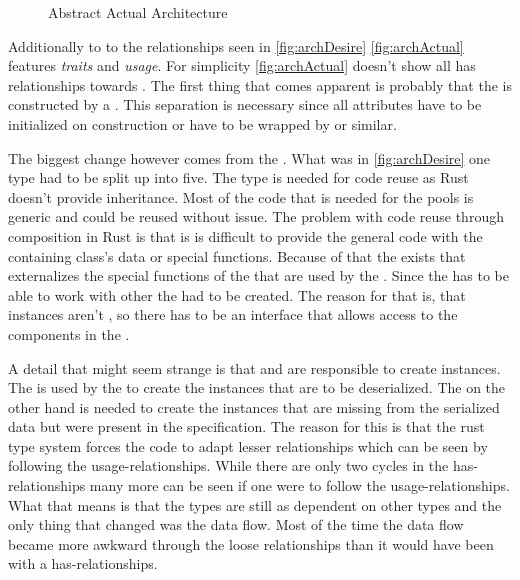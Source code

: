 \documentclass[thesis]{subfiles}
\begin{document}
  \begin{figure}[ht]
    \centering
    
    \caption{Abstract Actual Architecture}\label{fig:archActual}
  \end{figure}

  Additionally to to the relationships seen in \autoref{fig:archDesire} \autoref{fig:archActual} features \emph{traits} and \emph{usage}.
  For simplicity \autoref{fig:archActual} doesn't show all has relationships towards \String.
  The first thing that comes apparent is probably that the \SkillFile is constructed by a \SkillFileBuilder.
  This separation is necessary since all attributes have to be initialized  on construction or have to be wrapped by \OptionT or similar.

  The biggest change however comes from the \UserTypePool.
  What was in \autoref{fig:archDesire} one type had to be split up into five.
  The \Pool type is needed for code reuse as Rust doesn't provide inheritance.
  Most of the code that is needed for the pools is generic and could be reused without issue.
  The problem with code reuse through composition in Rust is that is is difficult to provide the general code with the containing class's data or special functions.
  Because of that the \UserPartsMaker exists that externalizes the special functions of the \UserTypePool that are used by the \Pool.
  Since the \Pool has to be able to work with other \Pools the \PoolProxy had to be created.
  The reason for that is, that \UserTypePool instances aren't \Pools, so there has to be an interface that allows access to the \Pool components in the \UserTypePools.

  A detail that might seem strange is that \PoolProxy and \PoolMaker are responsible to create \UserFieldDeclarations instances.
  The \PartsMaker is used by the \Pool to create the \UserFieldDeclaration instances that are to be deserialized.
  The \PoolProxy on the other hand is needed to create the \UserFieldDeclaration instances that are missing from the serialized data but were present in the specification.
  The reason for this is that the rust type system forces the code to adapt lesser relationships which can be seen by following the usage-relationships.
  While there are only two cycles in the has-relationships many more can be seen if one were to follow the usage-relationships.
  What that means is that the types are still as dependent on other types and the only thing that changed was the data flow.
  Most of the time the data flow became more awkward through the loose relationships than it would have been with a has-relationships.
\end{document}
